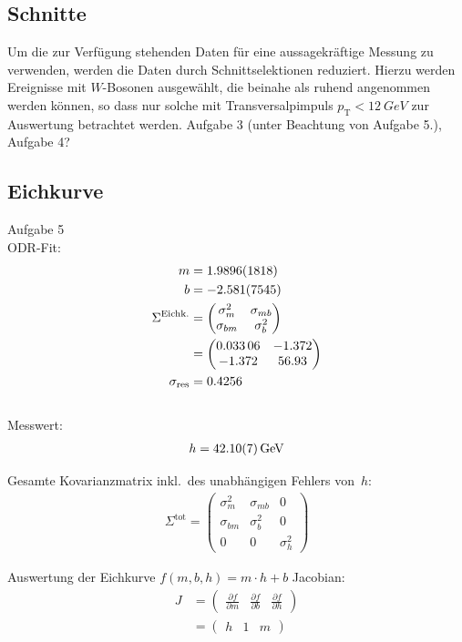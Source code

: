 \documentclass[11pt, a4paper]{article}
\numberwithin{equation}{section}
\begin{document}
\clearpage
\subsection{Schnitte}
Um die zur Verfügung stehenden Daten für eine aussagekräftige Messung zu verwenden, werden die Daten durch Schnittselektionen reduziert.
Hierzu werden Ereignisse mit $W$-Bosonen ausgewählt, die beinahe als ruhend angenommen werden können, so dass nur solche mit Transversalpimpuls $p_\mathrm{T}<\SI{12}{GeV}$ zur Auswertung betrachtet werden.  
Aufgabe 3 (unter Beachtung von Aufgabe 5.), Aufgabe 4?

\subsection{Eichkurve}
Aufgabe 5\\
\noindent ODR-Fit:
\begin{align*}
	m &= \num{1.9896 +- 0.1818} \\
	b &= \num{-2.581 +- 7.545} \\
	\Sigma^\mathrm{Eichk.} &= \begin{pmatrix}
	\sigma_m^2 & \sigma_{mb} \\
	\sigma_{bm} & \sigma_b^2
	\end{pmatrix}\\
	 &= \begin{pmatrix}
		\num{0.03306} & \num{-1.372} \\
		\num{-1.372}    & \num{56.93}
	\end{pmatrix}\\
	\sigma_\mathrm{res} &= \num{0.4256}\\	
\end{align*}
\\
Messwert:
\begin{align*}
	h = \SI{42.10 +- 0.07}{\GeV}
\end{align*}

Gesamte Kovarianzmatrix inkl.\ des unabhängigen Fehlers von~$h$:
\begin{align}
	\Sigma^\mathrm{tot} = \begin{pmatrix}
		\sigma_m^2  & \sigma_{mb} & 0 \\
		\sigma_{bm} & \sigma_b^2  & 0 \\
		0           & 0           & \sigma_h^2
	\end{pmatrix}
\end{align}

Auswertung der Eichkurve $f(m, b, h) = m \cdot h + b$ Jacobian:
\begin{align*}
	J &= \begin{pmatrix}
	\frac{\partial f}{\partial m} &
	\frac{\partial f}{\partial b} &
	\frac{\partial f}{\partial h}
	\end{pmatrix} \\
	&=\begin{pmatrix}
	h & 1 & m
	\end{pmatrix}
\end{align*}
\end{document}
